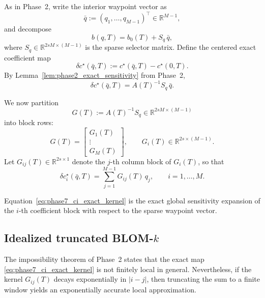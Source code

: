 As in Phase~2, write the interior waypoint vector as
\[
\bar q:=(q_1,\dots,q_{M-1})^\top\in\mathbb R^{M-1},
\]
and decompose
\begin{equation}
	\label{eq:phase7_rhs_affine}
	b(q,T)=b_0(T)+S_q\,\bar q,
\end{equation}
where \(S_q\in\mathbb R^{2sM\times(M-1)}\) is the sparse selector matrix.
Define the centered exact coefficient map
\begin{equation}
	\label{eq:phase7_centered_c}
	\delta c^\star(\bar q,T)
	:=
	c^\star(\bar q,T)-c^\star(0,T).
\end{equation}
By Lemma~\ref{lem:phase2_exact_sensitivity} from Phase~2,
\begin{equation}
	\label{eq:phase7_centered_linear}
	\delta c^\star(\bar q,T)
	=
	A(T)^{-1}S_q\,\bar q.
\end{equation}

We now partition
\[
G(T):=A(T)^{-1}S_q \in \mathbb R^{2sM\times(M-1)}
\]
into block rows:
\begin{equation}
	\label{eq:phase7_G_blocks}
	G(T)=
	\begin{bmatrix}
		G_1(T)\\
		\vdots\\
		G_M(T)
	\end{bmatrix},
	\qquad
	G_i(T)\in\mathbb R^{2s\times(M-1)}.
\end{equation}
Let \(G_{ij}(T)\in\mathbb R^{2s\times 1}\) denote the \(j\)-th column block of \(G_i(T)\), so that
\begin{equation}
	\label{eq:phase7_ci_exact_kernel}
	\delta c_i^\star(\bar q,T)
	=
	\sum_{j=1}^{M-1} G_{ij}(T)\,q_j,
	\qquad i=1,\dots,M.
\end{equation}

Equation~\eqref{eq:phase7_ci_exact_kernel} is the exact global sensitivity expansion of the \(i\)-th coefficient block with respect to the sparse waypoint vector.

\subsection{Idealized truncated BLOM-\texorpdfstring{$k$}{k}}
\label{subsec:phase7_idealized_truncation}

The impossibility theorem of Phase~2 states that the exact map \eqref{eq:phase7_ci_exact_kernel} is not finitely local in general.
Nevertheless, if the kernel \(G_{ij}(T)\) decays exponentially in \(|i-j|\), then truncating the sum to a finite window yields an exponentially accurate local approximation.

